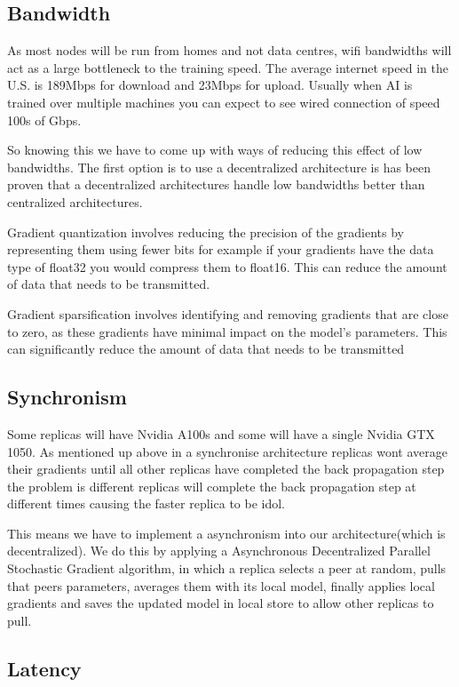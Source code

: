 \documentclass[11pt]{article}
\begin{document}
\subsection{Bandwidth}
As most nodes will be run from homes and not data centres, wifi bandwidths will act as a large bottleneck to the training speed. The average internet speed in the U.S. is 189Mbps for download and 23Mbps for upload. Usually when AI is trained over multiple machines you can expect to see wired connection of speed 100s of Gbps.

So knowing this we have to come up with ways of reducing this effect of low bandwidths. The first option is to use a decentralized architecture is has been proven that a decentralized architectures handle low bandwidths better than centralized architectures. 

Gradient quantization involves reducing the precision of the gradients by representing them using fewer bits for example if your gradients have the data type of float32 you would compress them to float16. This can reduce the amount of data that needs to be transmitted.

Gradient sparsification involves identifying and removing gradients that are close to zero, as these gradients have minimal impact on the model's parameters. This can significantly reduce the amount of data that needs to be transmitted

\subsection{Synchronism}

Some replicas will have Nvidia A100s and some will have a single Nvidia GTX 1050. As mentioned up above in a synchronise architecture replicas wont average their gradients until all other replicas have completed the back propagation step the problem is different replicas will complete the back propagation step at different times causing the faster replica to be idol.

This means we have to implement a asynchronism into our architecture(which is decentralized). We do this by applying a Asynchronous Decentralized Parallel Stochastic Gradient algorithm, in which a replica selects a peer at random, pulls that peers parameters, averages them with its local model, finally applies local gradients and saves the updated model in local store to allow other replicas to pull.



\subsection{Latency}



\end{document}
